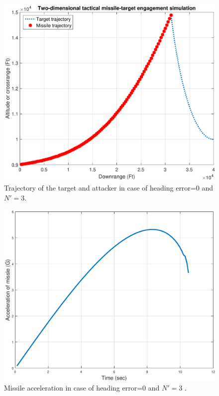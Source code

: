 \begin{figure}[htb]
	\centering
	\includegraphics[scale = 0.75]{fig/trajectory0NN3.pdf}
	\caption{Trajectory of the target and attacker in case of heading error=0 and $N'=3$.}
	\label{trajectory0NN3}
\end{figure}


\begin{figure}[htb]
	\centering
	\includegraphics[scale = 0.75]{fig/MissileAcceleration0NN3.pdf}
	\caption{Missile acceleration in case of heading error=0 and $N'=3$ .}
	\label{missile acceleration0NN3}
\end{figure}



